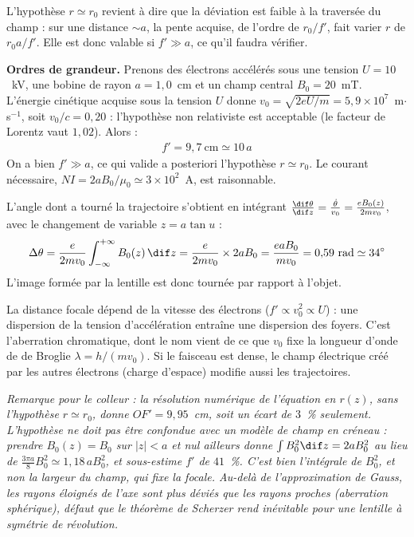 \begin{correction}
\begin{enumerate}
	L'hypothèse $r\simeq r_0$ revient à dire que la déviation est faible à la traversée du champ : sur une distance $\sim a$, la pente acquise, de l'ordre de $r_0/f'$, fait varier $r$ de $r_0a/f'$. Elle est donc valable si $f'\gg a$, ce qu'il faudra vérifier.


	\medskip
	\textbf{Ordres de grandeur.} Prenons des électrons accélérés sous une tension $U=10$~kV, une bobine de rayon $a=1{,}0$~cm et un champ central $B_0=20$~mT. L'énergie cinétique acquise sous la tension $U$ donne $v_0=\sqrt{2eU/m}=5{,}9\times10^{7}$~m$\cdot$s$^{-1}$, soit $v_0/c=0{,}20$ : l'hypothèse non relativiste est acceptable (le facteur de Lorentz vaut $1{,}02$). Alors :
	\begin{align*}
		f'=9{,}7~\text{cm}\simeq10\,a
	\end{align*}
	On a bien $f'\gg a$, ce qui valide a posteriori l'hypothèse $r\simeq r_0$. Le courant nécessaire, $NI=2aB_0/\mu_0\simeq3\times10^{2}$~A, est raisonnable.

	L'angle dont a tourné la trajectoire s'obtient en intégrant $\frac{\dif\theta}{\dif z}=\frac{\dot\theta}{v_0}=\frac{eB_0(z)}{2mv_0}$, avec le changement de variable $z=a\tan u$ :
	\begin{align*}
		\Delta\theta=\frac{e}{2mv_0}\int_{-\infty}^{+\infty}B_0(z)\,\dif z=\frac{e}{2mv_0}\times2aB_0=\frac{eaB_0}{mv_0}=0{,}59~\text{rad}\simeq34^\circ
	\end{align*}
	L'image formée par la lentille est donc tournée par rapport à l'objet.

	La distance focale dépend de la vitesse des électrons ($f'\propto v_0^2\propto U$) : une dispersion de la tension d'accélération entraîne une dispersion des foyers. C'est l'aberration chromatique, dont le nom vient de ce que $v_0$ fixe la longueur d'onde de de Broglie $\lambda=h/(mv_0)$. Si le faisceau est dense, le champ électrique créé par les autres électrons (charge d'espace) modifie aussi les trajectoires.

	\textit{Remarque pour le colleur : la résolution numérique de l'équation en $r(z)$, sans l'hypothèse $r\simeq r_0$, donne $OF'=9{,}95$~cm, soit un écart de $3$~\% seulement. L'hypothèse ne doit pas être confondue avec un modèle de champ en créneau : prendre $B_0(z)=B_0$ sur $|z|<a$ et nul ailleurs donne $\int B_0^2\dif z=2aB_0^2$ au lieu de $\frac{3\pi a}{8}B_0^2\simeq1{,}18\,aB_0^2$, et sous-estime $f'$ de $41$~\%. C'est bien l'intégrale de $B_0^2$, et non la largeur du champ, qui fixe la focale. Au-delà de l'approximation de Gauss, les rayons éloignés de l'axe sont plus déviés que les rayons proches (aberration sphérique), défaut que le théorème de Scherzer rend inévitable pour une lentille à symétrie de révolution.}

\end{enumerate}

\end{correction}
